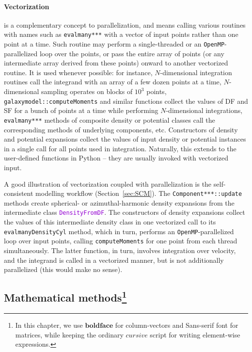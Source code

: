 \documentclass[12pt]{article}
\newcommand{\ttt}[1]{\textcolor{darkviolet}{\texttt{#1}}}
\let\oldparagraph\paragraph
\renewcommand{\paragraph}[1]{\vspace{-2mm}\oldparagraph{#1}}
\begin{document}
\paragraph{Vectorization}  is a complementary concept to parallelization, and means calling various routines with names such as \texttt{evalmany***} with a vector of input points rather than one point at a time. Such routine may perform a single-threaded or an \texttt{OpenMP}-parallelized loop over the points, or pass the entire array of points (or any intermediate array derived from these points) onward to another vectorized routine. It is used whenever possible: for instance, $N$-dimensional integration routines call the integrand with an array of a few dozen points at a time, $N$-dimensional sampling operates on blocks of $10^3$ points, \texttt{galaxymodel::computeMoments} and similar functions collect the values of DF and SF for a bunch of points at a time while performing $N$-dimensional integrations, \texttt{evalmany***} methods of composite density or potential classes call the corresponding methods of underlying components, etc. Constructors of density and potential expansions collect the values of input density or potential instances in a single call for all points used in integration. Naturally, this extends to the user-defined functions in Python -- they are usually invoked with vectorized input. 

A good illustration of vectorization coupled with parallelization is the self-consistent modelling workflow (Section~\ref{sec:SCM}). The \texttt{Component***::update} methods create spherical- or azimuthal-harmonic density expansions from the intermediate class \ttt{DensityFromDF}. The constructors of density expansions collect the values of this intermediate density class in one vectorized call to its \texttt{evalmanyDensityCyl} method, which in turn, performs an \texttt{OpenMP}-parallelized loop over input points, calling \texttt{computeMoments} for one point from each thread simultaneously. The latter function, in turn, involves integration over velocity, and the integrand is called in a vectorized manner, but is not additionally parallelized (this would make no sense).

\subsection[Mathematical methods]
{Mathematical methods\protect\footnote{
In this chapter, we use $\boldsymbol{boldface}$ for column-vectors and \textsf{Sans-serif} font for matrices, while keeping the ordinary $cursive$ script for writing element-wise expressions.}}
\end{document}
